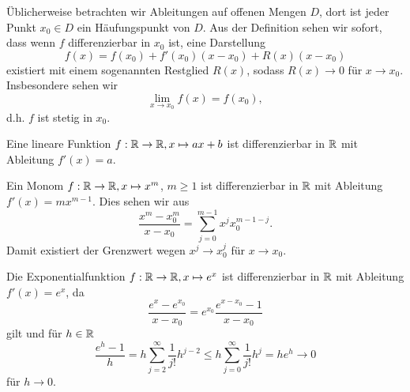 Üblicherweise betrachten wir Ableitungen auf offenen Mengen \(D\), dort ist jeder Punkt \(x_0 \in D\) ein Häufungspunkt von \(D\).
Aus der Definition sehen wir sofort, dass wenn \(f\) differenzierbar in \(x_0\) ist, eine Darstellung
\begin{equation*}
 f(x) = f(x_0) + f'(x_0)(x-x_0) +R(x)(x-x_0)
\end{equation*}
existiert mit einem sogenannten Restglied \(R(x)\), sodass \(R(x) \rightarrow 0 \) für \(x \rightarrow x_0\). Insbesondere sehen wir
\begin{equation*}
 \lim_{x \rightarrow x_0} f(x) = f(x_0),
\end{equation*}
d.h. \(f\) ist stetig in \(x_0\).
\label{differential/differential:example-1}
\begin{example}{}{}



Eine lineare Funktion \(f: \mathbb{R} \rightarrow \mathbb{R}, x \mapsto a x + b\) ist differenzierbar in \(\mathbb{R}\) mit Ableitung \(f'(x) = a\).
\end{example}
\label{differential/differential:example-2}
\begin{example}{}{}



Ein Monom \(f: \mathbb{R} \rightarrow \mathbb{R}, x \mapsto x^m\), \(m \geq 1\) ist differenzierbar in \(\mathbb{R}\) mit Ableitung \(f'(x) = m x^{m-1}\). Dies sehen wir aus
\begin{equation*}
 \frac{x^m - x_0^m}{x-x_0} = \sum_{j=0}^{m-1} x^j x_0^{m-1-j} .
\end{equation*}
Damit existiert der Grenzwert wegen \(x^j \rightarrow x_0^j\) für \(x \rightarrow x_0\).
\end{example}
\label{differential/differential:example-3}
\begin{example}{}{}



Die Exponentialfunktion \(f: \mathbb{R} \rightarrow \mathbb{R}, x \mapsto e^x\) ist differenzierbar in \(\mathbb{R}\) mit Ableitung \(f'(x) = e^x\), da
\begin{equation*}
 \frac{e^x - e^{x_0}}{x-x_0} = e^{x_0}  \frac{e^{x-x_0}-1}{x-x_0}
\end{equation*}
gilt und für \(h \in \mathbb{R}\)
\begin{equation*}
 \frac{e^h - 1}h =  h \sum_{j=2}^\infty \frac{1}{j!}h^{j-2} \leq h  \sum_{j=0}^\infty \frac{1}{j!}h^{j} = h e^h \rightarrow 0
\end{equation*}
für \(h \rightarrow 0\).
\end{example}


